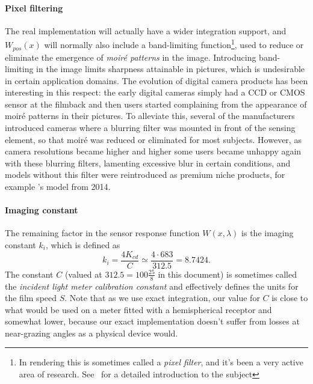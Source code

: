 \paragraph{Pixel filtering}
The real implementation will actually have a wider integration support,
and $W_{pos}(x)$ will normally also include a band-limiting function\footnote{
	In rendering this is sometimes called a \textsl{\gls{pixel filter}}, and it's 
	been a very active area of research. See~\cite{pharr2023} for a detailed
	introduction to the subject}, 
used to reduce or eliminate the emergence of \emph{moir\'e patterns} in the image. 
Introducing band-limiting in the image limits sharpness attainable in pictures,
which is undesirable in certain application domains. 
The evolution of digital camera products has been interesting in this respect:
the early digital cameras simply had a \gls{CCD} or \gls{CMOS} sensor at the 
filmback and then users started complaining from the appearance of moir\'e 
patterns in their pictures. 
To alleviate this, several of the manufacturers introduced cameras where a 
blurring filter was mounted in front of the sensing element, 
so that moir\'e was reduced or eliminated for most subjects. 
However, as camera resolutions became higher and higher some users became unhappy again
with these blurring filters, lamenting excessive blur in certain conditions, 
and models without this filter were reintroduced as premium niche products, 
for example 's  model from 2014.


\paragraph{Imaging constant}

The remaining factor in the sensor response function $W(x,\lambda)$ is the
imaging constant $k_i$, which is defined as
\begin{equation}\label{eqn:imaging_ki}
	k_i = \frac{4K_{cd}}{C} \simeq \frac{4\cdot683}{312.5} = 8.7424.
\end{equation}
The constant $C$ (valued at $312.5 = 100 \frac{25}8$ in this document) is sometimes called the \textsl{incident light meter
calibration constant} and effectively defines the units for the \gls{film speed} $S$.
Note that as we use exact integration, our value for $C$ is close to what would be used on a meter fitted with a hemispherical receptor and somewhat lower, because our exact implementation doesn't suffer from losses at near-grazing angles as a physical device would.

